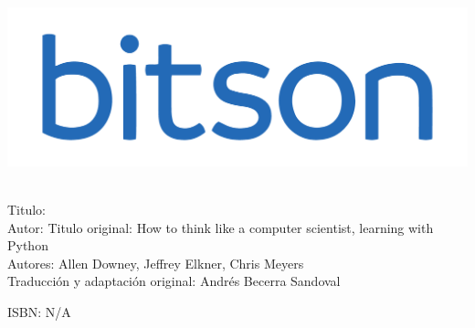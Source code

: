 \vfill{}

\newpage{}

\thispagestyle{empty} \vfill{}
\includegraphics[scale=0.3]{illustrations/logotipo-alpha.png} \\

\parindent0pt {\tiny{}\ }{\tiny \par}

%

{\scriptsize{}Titulo: \introprog }\\
{\scriptsize{}Autor: \AutorNombreCompleto}
{\scriptsize{}Titulo original: How to think like a computer scientist, learning with Python}\\
{\scriptsize{}Autores: Allen Downey, Jeffrey Elkner, Chris Meyers }\\
{\scriptsize{}Traducción y adaptación original: Andrés Becerra Sandoval }\\
{\scriptsize \par}

{\scriptsize{}ISBN: N/A}\\
{\scriptsize \par}

%

